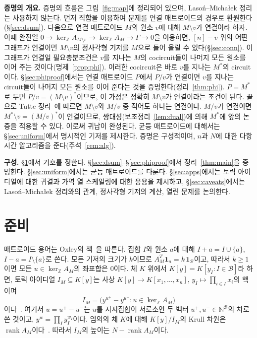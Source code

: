 \documentclass[11pt,a4paper]{article}
\newcommand{\lstroke}{{\lmfont ł}}
\theoremstyle{plain}
\theoremstyle{definition}
\newcommand{\Z}{\mathbb Z}
\newcommand{\N}{\mathbb N}
\newcommand{\AM}{A_M}
\newcommand{\kerZ}{\ker_{\Z}\!A_M}
\newcommand{\bs}{\mathcal B}
\newcommand{\rank}{\operatorname{rank}}
\newcommand{\ind}{\mathbf 1}
\newcommand{\LM}{Lasoń--Micha\lstroke{}ek}
\begin{document}
\medskip\noindent\textbf{증명의 개요.} 증명의 흐름은 그림~\ref{fig:map}에 정리되어 있으며, \LM{} 정리는 사용하지 않는다. 먼저 직합을 이용하여 문제를 연결 매트로이드의 경우로 환원한다(\S\ref{sec:dsum}). 다음으로 연결 매트로이드 $M$의 원소 $v$에 대해 $M\setminus v$가 연결이라 하자. 이때 완전열 $0\to\ker_\Z A_{M\setminus v}\to\kerZ\to\Gamma\to0$을 이용하면, $[n]-v$ 위의 어떤 그래프가 연결이면 $M\setminus v$의 정사각형 기저를 $M$으로 들어 올릴 수 있다(\S\ref{sec:conn}). 이 그래프가 연결일 필요충분조건은 $v$를 지나는 $M$의 cocircuit들이 나머지 모든 원소를 이어 주는 것이다(명제~\ref{prop:phi}). 이러한 cocircuit은 바로 $v$를 지나는 $M^*$의 circuit이다. \S\ref{sec:phiproof}에서는 연결 매트로이드 $P$에서 $P/v$가 연결이면 $v$를 지나는 circuit들이 나머지 모든 원소를 이어 준다는 것을 증명한다(정리~\ref{thm:phi}). $P=M^*$로 두면 $P/v=(M\setminus v)^*$이므로, 이 가정은 정확히 $M\setminus v$가 연결이라는 조건이 된다. 끝으로 Tutte 정리~\cite[\S4.3]{Ox11}에 따르면 $M\setminus v$와 $M/v$ 중 적어도 하나는 연결이다. $M/v$가 연결이면 $M^*\setminus v=(M/v)^*$이 연결이므로, 쌍대성(보조정리~\ref{lem:dual})에 의해 $M^*$에 앞의 논증을 적용할 수 있다. 이로써 귀납이 완성된다. 균등 매트로이드에 대해서는 \S\ref{sec:uniform}에서 명시적인 기저를 제시한다. 증명은 구성적이며, $n$과 $N$에 대한 다항 시간 알고리즘을 준다(주석~\ref{rem:alg}).

\medskip\noindent\textbf{구성.} \S\ref{sec:prelim}에서 기호를 정한다. \S\ref{sec:dsum}--\S\ref{sec:phiproof}에서 정리~\ref{thm:main}을 증명한다. \S\ref{sec:uniform}에서는 균등 매트로이드를 다룬다. \S\ref{sec:apps}에서는 토릭 아이디얼에 대한 귀결과 가역 열 스케일링에 대한 응용을 제시하고, \S\ref{sec:caveats}에서는 \LM{} 정리와의 관계, 정사각형 기저의 계산, 열린 문제를 논의한다.

\section{준비}\label{sec:prelim}
매트로이드 용어는 Oxley의 책~\cite{Ox11}을 따른다. 집합 $I$와 원소 $a$에 대해 $I+a=I\cup\{a\}$, $I-a=I\setminus\{a\}$로 쓴다. 모든 기저의 크기가 $k$이므로 $\AM^{T}\ind_n=k\,\ind_{\bs}$이고, 따라서 $k\ge1$이면 모든 $u\in\kerZ$의 좌표합은 $0$이다. 체 $K$ 위에서 $K[y]=K[y_I:I\in\bs]$라 하면, 토릭 아이디얼 $I_M\subseteq K[y]$는 사상 $K[y]\to K[x_1,\dots,x_n]$, $y_I\mapsto\prod_{i\in I}x_i$의 핵이며
\[
I_M=\big(y^{u^+}-y^{u^-}:u\in\kerZ\big)
\]
이다~\cite{St96}. 여기서 $u=u^+-u^-$는 $u$를 지지집합이 서로소인 두 벡터 $u^+,u^-\in\N^{\bs}$의 차로 쓴 것이고, $y^w=\prod_Iy_I^{w_I}$이다. 임의의 체 $K$에 대해 $K[y]/I_M$의 Krull 차원은 $\rank\AM$이다~\cite{St96}. 따라서 $I_M$의 높이는 $N-\rank\AM$이다.
\end{document}
